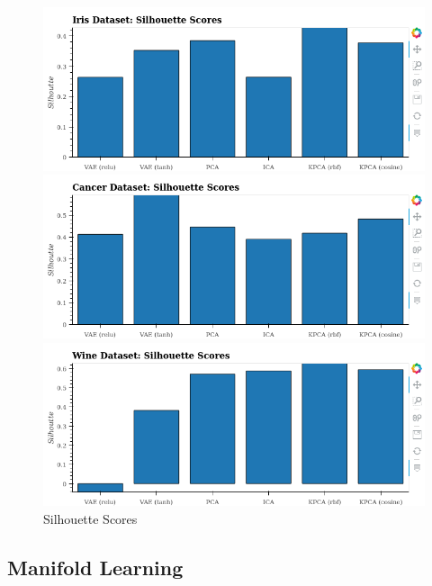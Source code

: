 \documentclass[12pt]{article}
\begin{document}
\begin{figure}[!htb]
         \centering
         \includegraphics[scale=0.5]{../../media/02-iris-silhouette.png}
       
         \label{fig:benchiriss}
     
         \includegraphics[scale=0.5]{../../media/02-cancer-silhouette.png}
     
         \label{fig:benchcancers}
     
         \includegraphics[scale=0.5]{../../media/02-wine-silhouette.png}

         \label{fig:benchwines}
        \caption{Silhouette Scores}
        \label{fig:clustering}
\end{figure}


\newpage

\subsection{Manifold Learning}
\end{document}
